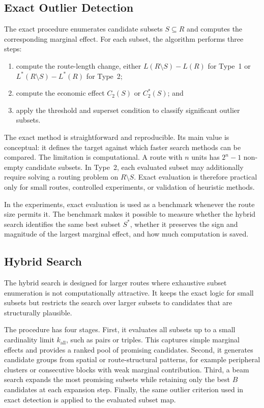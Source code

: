 \documentclass[preprint,12pt]{elsarticle}
\begin{document}
\subsection{Exact Outlier Detection}
\label{subsec:exact-outlier-detection}

The exact procedure enumerates candidate subsets $S\subseteq R$ and computes the corresponding marginal effect. For each subset, the algorithm performs three steps:
\begin{enumerate}[label=(\roman*)]
\item compute the route-length change, either $L(R\setminus S)-L(R)$ for Type~1 or $L^*(R\setminus S)-L^*(R)$ for Type~2;
\item compute the economic effect $C_2(S)$ or $C_2^*(S)$; and
\item apply the threshold and superset condition to classify significant outlier subsets.
\end{enumerate}

The exact method is straightforward and reproducible. Its main value is conceptual: it defines the target against which faster search methods can be compared. The limitation is computational. A route with $n$ units has $2^n-1$ non-empty candidate subsets. In Type~2, each evaluated subset may additionally require solving a routing problem on $R\setminus S$. Exact evaluation is therefore practical only for small routes, controlled experiments, or validation of heuristic methods.

In the experiments, exact evaluation is used as a benchmark whenever the route size permits it. The benchmark makes it possible to measure whether the hybrid search identifies the same best subset $S^*$, whether it preserves the sign and magnitude of the largest marginal effect, and how much computation is saved.

\subsection{Hybrid Search}
\label{subsec:hybrid-search}

The hybrid search is designed for larger routes where exhaustive subset enumeration is not computationally attractive. It keeps the exact logic for small subsets but restricts the search over larger subsets to candidates that are structurally plausible.

The procedure has four stages. First, it evaluates all subsets up to a small cardinality limit $k_{\mathrm{all}}$, such as pairs or triples. This captures simple marginal effects and provides a ranked pool of promising candidates. Second, it generates candidate groups from spatial or route-structural patterns, for example peripheral clusters or consecutive blocks with weak marginal contribution. Third, a beam search expands the most promising subsets while retaining only the best $B$ candidates at each expansion step. Finally, the same outlier criterion used in exact detection is applied to the evaluated subset map.
\end{document}
